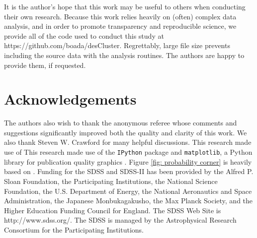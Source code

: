 \documentclass[fleqn,usenatbib]{mnras}
\begin{document}
It is the author's hope that this work may be useful to others when conducting their own research. Because this work relies heavily on (often) complex data analysis, and in order to promote transparency and reproducible science, we provide all of the code used to conduct this study at https://github.com/boada/desCluster. Regrettably, large file size prevents including the source data with the analysis routines. The authors are happy to provide them, if requested.

\section*{Acknowledgements}
The authors also wish to thank the anonymous referee whose comments and suggestions significantly improved both the quality and clarity of this work. We also thank Steven W. Crawford for many helpful discussions. This research made use of This research made use of the {\tt IPython} package \citep{Perez2007} and {\tt matplotlib}, a Python library for publication quality graphics \citep{Hunter2007}. Figure \ref{fig: probability corner} is heavily based on \cite{Foreman-Mackey2016}. Funding for the SDSS and SDSS-II has been provided by the Alfred P. Sloan Foundation, the Participating Institutions, the National Science Foundation, the U.S. Department of Energy, the National Aeronautics and Space Administration, the Japanese Monbukagakusho, the Max Planck Society, and the Higher Education Funding Council for England. The SDSS Web Site is http://www.sdss.org/. The SDSS is managed by the Astrophysical Research Consortium for the Participating Institutions.



%
%

\bsp	%
\label{lastpage}
\end{document}
